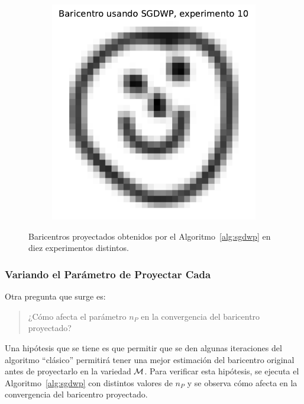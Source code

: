 \begin{figure}[H]
\begin{subfigure}[b]{0.17\textwidth}
        \label{fig:bar-SGDWP-exp-09}
    \end{subfigure}
    \hfill
    \begin{subfigure}[b]{0.17\textwidth}
        \centering
        \includegraphics[width=\textwidth]{img/sgdwp/bar-SGDWP-exp-10.pdf}
        \label{fig:bar-SGDWP-exp-10}
    \end{subfigure}
    \caption{Baricentros proyectados obtenidos por el Algoritmo~\ref{alg:sgdwp} en diez experimentos distintos.}
    \label{fig:bar-SGDWP-exp}
\end{figure}

\subsubsection{Variando el Parámetro de Proyectar Cada}\label{sssec:sgdwp-variar-param}  %

Otra pregunta que surge es:
\begin{quotation}
    \centering
    ¿Cómo afecta el parámetro $n_P$ en la convergencia del baricentro proyectado?
\end{quotation}
Una hipótesis que se tiene es que permitir que se den algunas iteraciones del algoritmo ``clásico'' permitirá tener una mejor estimación del baricentro original antes de proyectarlo en la variedad $\operatorname{\mathcal{M}}$. Para verificar esta hipótesis, se ejecuta el Algoritmo~\ref{alg:sgdwp} con distintos valores de $n_P$ y se observa cómo afecta en la convergencia del baricentro proyectado.

